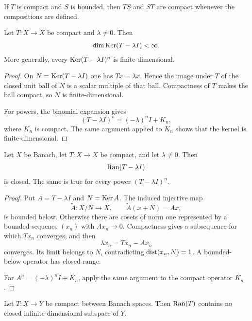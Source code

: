\begin{notelemma}[Composition]
If $T$ is compact and $S$ is bounded, then $TS$ and $ST$ are compact whenever
the compositions are defined.
\end{notelemma}

\begin{notetheorem}
Let $T\colon X\to X$ be compact and $\lambda\ne0$.  Then
\[
  \dim\operatorname{Ker}(T-\lambda I)<\infty.
\]
More generally, every $\operatorname{Ker}(T-\lambda I)^n$ is finite-dimensional.
\end{notetheorem}

\begin{proof}
On $N=\operatorname{Ker}(T-\lambda I)$ one has $Tx=\lambda x$.  Hence the image under $T$
of the closed unit ball of $N$ is a scalar multiple of that ball.  Compactness
of $T$ makes the ball compact, so $N$ is finite-dimensional.

For powers, the binomial expansion gives
\[
  (T-\lambda I)^n=(-\lambda)^nI+K_n,
\]
where $K_n$ is compact.  The same argument applied to $K_n$ shows that the
kernel is finite-dimensional.
\end{proof}

\begin{notetheorem}
Let $X$ be Banach, let $T\colon X\to X$ be compact, and let
$\lambda\ne0$.  Then
\[
  \operatorname{Ran}(T-\lambda I)
\]
is closed.  The same is true for every power $(T-\lambda I)^n$.
\end{notetheorem}

\begin{proof}
Put $A=T-\lambda I$ and $N=\operatorname{Ker} A$.  The induced injective map
\[
  \widetilde A\colon X/N\to X,
  \qquad \widetilde A(x+N)=Ax,
\]
is bounded below.  Otherwise there are cosets of norm one represented by a
bounded sequence $(x_n)$ with $Ax_n\to0$.  Compactness gives a subsequence
for which $Tx_n$ converges, and then
\[
  \lambda x_n=Tx_n-Ax_n
\]
converges.  Its limit belongs to $N$, contradicting
$\operatorname{dist}(x_n,N)=1$.  A bounded-below operator has closed range.

For $A^n=(-\lambda)^nI+K_n$, apply the same argument to the compact operator
$K_n$.
\end{proof}

\begin{notecorollary}
Let $T\colon X\to Y$ be compact between Banach spaces.  Then
$\operatorname{Ran}(T)$ contains no closed infinite-dimensional subspace of $Y$.
\end{notecorollary}

